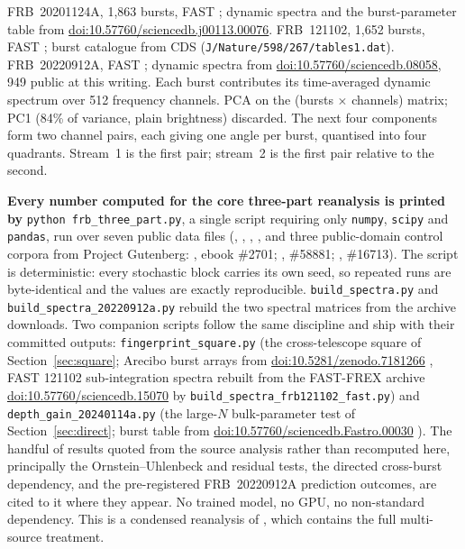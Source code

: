 \documentclass[11pt,a4paper]{article}
\providecommand{\doi}[1]{\href{https://doi.org/#1}{doi:#1}}
\begin{document}
FRB~20201124A, 1{,}863 bursts, FAST \cite{wang2023}; dynamic spectra and the
burst-parameter table from \doi{10.57760/sciencedb.j00113.00076}. FRB~121102, 1{,}652
bursts, FAST \cite{li2021}; burst catalogue from CDS
(\texttt{J/Nature/598/267/tables1.dat}). FRB~20220912A, FAST \cite{zhang2023}; dynamic
spectra from \doi{10.57760/sciencedb.08058}, 949 public at this writing. Each burst
contributes its time-averaged dynamic spectrum over 512 frequency channels. PCA on the (bursts $\times$ channels) matrix; PC1 (84\% of variance,
plain brightness) discarded. The next four components form two channel pairs, each
giving one angle per burst, quantised into four quadrants. Stream~1 is the first pair;
stream~2 is the first pair relative to the second.

\textbf{Every number computed for the core three-part reanalysis is printed by}
\texttt{python frb\_three\_part.py}, a single script requiring only \texttt{numpy},
\texttt{scipy} and \texttt{pandas}, run over seven public data files
(, ,
, , and three
public-domain control corpora from Project Gutenberg: ,
ebook \#2701; , \#58881;
, \#16713).
The script is deterministic: every stochastic block carries its own seed, so repeated
runs are byte-identical and the values are exactly reproducible.
\texttt{build\_spectra.py} and \texttt{build\_spectra\_20220912a.py} rebuild the two
spectral matrices from the archive downloads. Two companion scripts follow the same
discipline and ship with their committed outputs: \texttt{fingerprint\_square.py}
(the cross-telescope square of Section~\ref{sec:square}; Arecibo burst arrays from
\doi{10.5281/zenodo.7181266} \cite{hewitt2022}, FAST 121102 sub-integration spectra
rebuilt from the FAST-FREX archive \doi{10.57760/sciencedb.15070} by
\texttt{build\_spectra\_frb121102\_fast.py}) and \texttt{depth\_gain\_20240114a.py}
(the large-$N$ bulk-parameter test of Section~\ref{sec:direct}; burst table from
\doi{10.57760/sciencedb.Fastro.00030} \cite{zhangjs2025}). The handful of results quoted from the
source analysis rather than recomputed here, principally the Ornstein--Uhlenbeck and
residual tests, the directed cross-burst dependency, and the pre-registered
FRB~20220912A prediction outcomes, are cited to it where they appear.
No trained model, no GPU, no non-standard dependency. This is a condensed reanalysis of
\cite{meucci2026}, which contains the full multi-source treatment.
\end{document}
